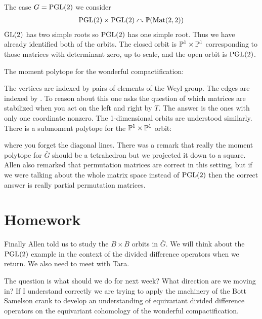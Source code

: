 \documentclass[12pt]{article}
\begin{document}
\begin{example}
	The case $G = \PGL(2)$ we consider \begin{align*}
		\PGL(2) \times \PGL(2) \curvearrowright \P(\Mat(2,2))
	\end{align*} $\GL(2)$ has two simple roots so $\PGL(2)$ has one simple root. Thus we have already identified both of the orbits.
	The closed orbit is $\P^1\times \P^1$ corresponding to those matrices with determinant zero, up to scale, and the
	open orbit is $\PGL(2)$.

	The moment polytope for the wonderful compactification:
	\begin{center}
	\end{center}
	The vertices are indexed by pairs of elements of the Weyl group. The edges are indexed by .
	To reason about this one asks the question of which matrices are stabilized when you act on the left and right by $T$.
	The answer is the ones with only one coordinate nonzero. The 1-dimensional orbits are understood similarly.
	There is a submoment polytope for the $\P^1\times \P^1$ orbit:
	\begin{center}
	\end{center}
	where you forget the diagonal lines. There was a remark that really the moment polytope for $\bar G$
	should be a tetrahedron but we projected it down to a square. Allen also remarked that permutation matrices are
	correct in this setting, but if we were talking about the whole matrix space instead of $\PGL(2)$ then
	the correct answer is really partial permutation matrices.
\end{example}
\section{Homework}
Finally Allen told us to study the $B\times B$ orbits in $\bar G$. We will think about the $\PGL(2)$ example in the context
of the divided difference operators when we return. We also need to meet with Tara.

\hfill

The question is what should we do for next week? What direction are we moving in? If I understand correctly
we are trying to apply the machinery of the Bott Samelson crank to develop an understanding of
equivariant divided difference operators on the equivariant cohomology of the wonderful compactification.
\end{document}

